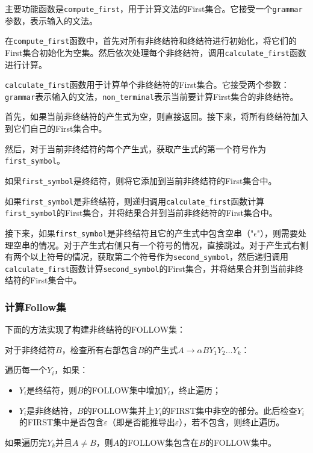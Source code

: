 \documentclass[lang=cn,11pt,a4paper]{elegantpaper}
\begin{document}
主要功能函数是\lstinline{compute_first}，用于计算文法的First集合。它接受一个\lstinline{grammar}参数，表示输入的文法。

在\lstinline{compute_first}函数中，首先对所有非终结符和终结符进行初始化，将它们的First集合初始化为空集。然后依次处理每个非终结符，调用\lstinline{calculate_first}函数进行计算。

\lstinline{calculate_first}函数用于计算单个非终结符的First集合。它接受两个参数：\lstinline{grammar}表示输入的文法，\lstinline{non_terminal}表示当前要计算First集合的非终结符。

首先，如果当前非终结符的产生式为空，则直接返回。接下来，将所有终结符加入到它们自己的First集合中。

然后，对于当前非终结符的每个产生式，获取产生式的第一个符号作为\lstinline{first_symbol}。

如果\lstinline{first_symbol}是终结符，则将它添加到当前非终结符的First集合中。

如果\lstinline{first_symbol}是非终结符，则递归调用\lstinline{calculate_first}函数计算\lstinline{first_symbol}的First集合，并将结果合并到当前非终结符的First集合中。

接下来，如果\lstinline{first_symbol}是非终结符且它的产生式中包含空串（"$\epsilon$"），则需要处理空串的情况。对于产生式右侧只有一个符号的情况，直接跳过。对于产生式右侧有两个以上符号的情况，获取第二个符号作为\lstinline{second_symbol}，然后递归调用\lstinline{calculate_first}函数计算\lstinline{second_symbol}的First集合，并将结果合并到当前非终结符的First集合中。

\subsubsection{计算Follow集}
下面的方法实现了构建非终结符的FOLLOW集：

对于非终结符$B$，检查所有右部包含$B$的产生式$A\rightarrow\alpha BY_1Y_2\ldots Y_k$：

遍历每一个$Y_i$，如果：

\begin{itemize}
    \item $Y_i$是终结符，则$B$的FOLLOW集中增加$Y_i$，终止遍历；
    \item $Y_i$是非终结符，$B$的FOLLOW集并上$Y_i$的FIRST集中非空的部分。此后检查$Y_i$的FIRST集中是否包含$\varepsilon$（即是否能推导出$\varepsilon$），若不包含，则终止遍历。
\end{itemize}

如果遍历完$Y_k$并且$A\not=B$，则$A$的FOLLOW集包含在$B$的FOLLOW集中。
\end{document}
